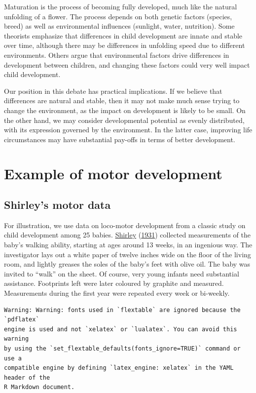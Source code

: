\documentclass[
]{book}
\begin{document}
Maturation is the process of becoming fully developed, much like the natural unfolding of a flower. The process depends on both genetic factors (species, breed) as well as environmental influences (sunlight, water, nutrition). Some theorists emphasize that differences in child development are innate and stable over time, although there may be differences in unfolding speed due to different environments. Others argue that environmental factors drive differences in development between children, and changing these factors could very well impact child development.

Our position in this debate has practical implications. If we believe that differences are natural and stable, then it may not make much sense trying to change the environment, as the impact on development is likely to be small. On the other hand, we may consider developmental potential as evenly distributed, with its expression governed by the environment. In the latter case, improving life circumstances may have substantial pay-offs in terms of better development.

\hypertarget{sec:motorexample}{%
\section{Example of motor development}\label{sec:motorexample}}

\hypertarget{shirleys-motor-data}{%
\subsection{Shirley's motor data}\label{shirleys-motor-data}}

For illustration, we use data on loco-motor development from a classic study on child development among 25 babies. \protect\hyperlink{ref-shirley1931}{Shirley} (\protect\hyperlink{ref-shirley1931}{1931}) collected measurements of the baby's walking ability, starting at ages around 13 weeks, in an ingenious way. The investigator lays out a white paper of twelve inches wide on the floor of the living room, and lightly greases the soles of the baby's feet with olive oil. The baby was invited to ``walk'' on the sheet. Of course, very young infants need substantial assistance. Footprints left were later coloured by graphite and measured. Measurements during the first year were repeated every week or bi-weekly.

\begin{verbatim}
Warning: Warning: fonts used in `flextable` are ignored because the `pdflatex`
engine is used and not `xelatex` or `lualatex`. You can avoid this warning
by using the `set_flextable_defaults(fonts_ignore=TRUE)` command or use a
compatible engine by defining `latex_engine: xelatex` in the YAML header of the
R Markdown document.
\end{verbatim}
\end{document}
